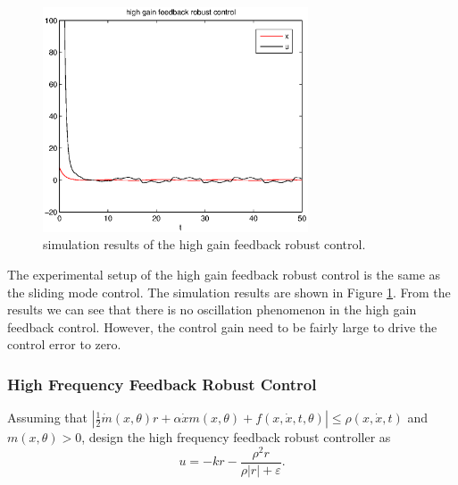 \documentclass[12pt,a4paper]{article}
\begin{document}
\begin{figure}
  \centering
  \includegraphics[width=0.7\textwidth]{figs/high_gain.eps}%
  \caption{simulation results of the high gain feedback robust control.}
  \label{high_gain}
\end{figure}

\indent The experimental setup of the high gain feedback robust control is the same as the sliding mode control. The simulation results are shown in Figure \ref{high_gain}. From the results we can see that there is no oscillation phenomenon in the high gain feedback control. However, the control gain need to be fairly large to drive the control error to zero.

\subsubsection{High Frequency Feedback Robust Control}

\indent Assuming that $\left|\frac12\dot m(x,\theta)r+\alpha\dot xm(x,\theta)+f(x,\dot x,t,\theta)\right|\le\rho(x,\dot x,t)$ and $m(x,\theta)>0$, design the high frequency feedback robust controller as
\begin{equation}
u=-kr-\frac{\rho^2r}{\rho|r|+\varepsilon}.
\end{equation}
\end{document}
